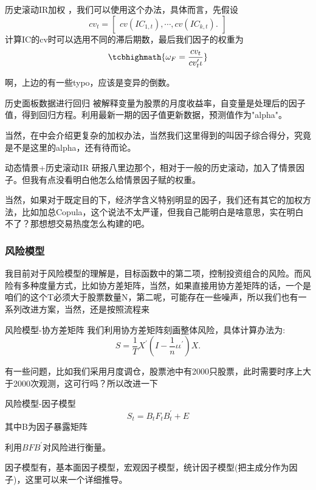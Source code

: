 \documentclass[12pt]{article}
\begin{document}
\begin{sdefinition}{历史滚动IR加权}{}
，我们可以使用这个办法，具体而言，先假设
$$
cv_t = \begin{bmatrix}
	cv(IC_{1,t}),\cdots,cv(IC_{k,t}).
\end{bmatrix}
$$
计算IC的cv时可以选用不同的滞后期数，最后我们因子的权重为
$$
\tcbhighmath{\omega_F = \frac{cv_t}{cv_t^\prime \iota}}
$$
\end{sdefinition}
啊，上边的有一些typo，应该是变异的倒数。
\begin{sdefinition}{历史面板数据进行回归}{}
被解释变量为股票的月度收益率，自变量是处理后的因子值，得到回归方程。利用最新一期的因子值更新数据，预测值作为"alpha"。
\end{sdefinition}


当然，在中会介绍更复杂的加权办法，当然我们这里得到的叫因子综合得分，究竟是不是这里的alpha，还有待而论。

\begin{sdefinition}{动态情景+历史滚动IR}{}
	研报八里边那个，相对于一般的历史滚动，加入了情景因子。但我有点没看明白他怎么给情景因子赋的权重。
\end{sdefinition}

\begin{sremark}{}{}
当然，如果对于既定目的下，经济学含义特别明显的因子，我们还有其它的加权方法，比如加总Copula，这个说法不太严谨，但我自己能明白是啥意思，实在明白不了？那想想交易热度怎么构建的吧。
\end{sremark}

\subsubsection{风险模型}
我目前对于风险模型的理解是，目标函数中的第二项，控制投资组合的风险。而风险有多种度量方式，比如协方差矩阵，当然，如果直接用协方差矩阵的话，一个是咱们的这个T必须大于股票数量N，第二呢，可能存在一些噪声，所以我们也有一系列改进方案，当然，还是按照流程来
\begin{sdefinition}{风险模型-协方差矩阵}{}
	我们利用协方差矩阵刻画整体风险，具体计算办法为:
$$
S = \frac{1}{T}X^\prime(I-\frac{1}{n}\iota \iota^\prime)X.
$$
\end{sdefinition}
\begin{sremark}{}{}
	有一些问题，比如我们采用月度调仓，股票池中有2000只股票，此时需要时序上大于2000次观测，这可行吗？所以改进一下
\end{sremark}

\begin{sdefinition}{风险模型-因子模型}{}
$$
S_t = B_tF_tB_t^\prime + E 
$$
其中B为因子暴露矩阵
\end{sdefinition}
利用$BFB^\prime$对风险进行衡量。
\begin{sremark}{}{}
因子模型有，基本面因子模型，宏观因子模型，统计因子模型(把主成分作为因子)，这里可以来一个详细推导。
\end{sremark}
\end{document}
